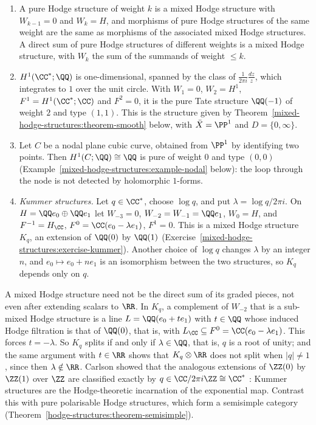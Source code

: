 \begin{example}\label{mixed-hodge-structures:example-mhs}
\begin{enumerate}
\item A pure Hodge structure of weight $k$ is a mixed Hodge structure with $W_{k-1} = 0$ and $W_k = H$, and morphisms of pure Hodge structures of the same weight are the same as morphisms of the
associated mixed Hodge structures. A direct sum of pure Hodge structures of different weights is a mixed Hodge structure, with $W_k$ the sum of the summands of weight $\leq k$.
\item $H^1(\CC^*; \QQ)$ is one-dimensional, spanned by the class of $\frac{1}{2\pi i}\frac{dz}{z}$, which integrates to $1$ over the unit circle. With $W_1 = 0$, $W_2 = H^1$, $F^1 = H^1(\CC^*; \CC)$ and
$F^2 = 0$, it is the pure Tate structure $\QQ(-1)$ of weight $2$ and type $(1,1)$. This is the structure given by Theorem~\ref{mixed-hodge-structures:theorem-smooth} below, with $\bar X = \PP^1$ and $D = \{0, \infty\}$.
\item Let $C$ be a nodal plane cubic curve, obtained from $\PP^1$ by identifying two points. Then $H^1(C; \QQ) \cong \QQ$ is pure of weight $0$ and type $(0,0)$
(Example~\ref{mixed-hodge-structures:example-nodal} below): the loop through the node is not detected by holomorphic $1$-forms.
\item \emph{Kummer structures.} Let $q \in \CC^*$, choose $\log q$, and put $\lambda = \log q/2\pi i$. On $H = \QQ e_0 \oplus \QQ e_1$ let $W_{-3} = 0$, $W_{-2} = W_{-1} = \QQ e_1$, $W_0 = H$, and
$F^{-1} = H_\CC$, $F^0 = \CC(e_0 - \lambda e_1)$, $F^1 = 0$. This is a mixed Hodge structure $K_q$, an extension of $\QQ(0)$ by $\QQ(1)$ (Exercise~\ref{mixed-hodge-structures:exercise-kummer}). Another choice
of $\log q$ changes $\lambda$ by an integer $n$, and $e_0 \mapsto e_0 + ne_1$ is an isomorphism between the two structures, so $K_q$ depends only on $q$.
\end{enumerate}
\end{example}

\begin{counterexample}\label{mixed-hodge-structures:counterexample-no-splitting}
A mixed Hodge structure need not be the direct sum of its graded pieces, not even after extending scalars to $\RR$. In $K_q$, a complement of $W_{-2}$ that is a sub-mixed Hodge structure is a line
$L = \QQ(e_0 + te_1)$ with $t \in \QQ$ whose induced Hodge filtration is that of $\QQ(0)$, that is, with $L_\CC \subseteq F^0 = \CC(e_0 - \lambda e_1)$. This forces $t = -\lambda$. So $K_q$ splits if and
only if $\lambda \in \QQ$, that is, $q$ is a root of unity; and the same argument with $t \in \RR$ shows that $K_q \otimes \RR$ does not split when $|q| \neq 1$, since then $\lambda \notin \RR$. Carlson showed
that the analogous extensions of $\ZZ(0)$ by $\ZZ(1)$ over $\ZZ$ are classified exactly by $q \in \CC/2\pi i\ZZ \cong \CC^*$ \cite{carlson-1980}: Kummer structures are the Hodge-theoretic incarnation of
the exponential map. Contrast this with pure polarisable Hodge structures, which form a semisimple category (Theorem~\ref{hodge-structures:theorem-semisimple}).
\end{counterexample}

